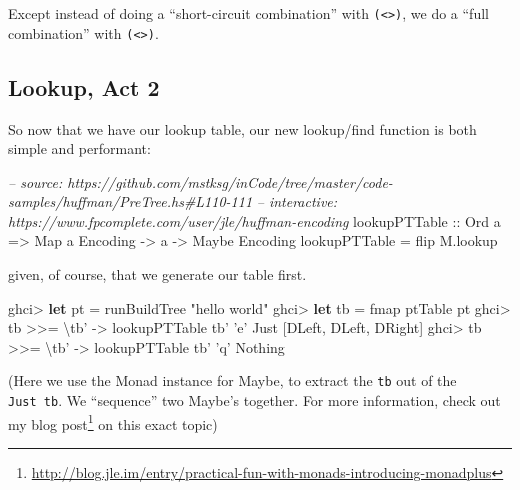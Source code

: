 \documentclass[]{article}
\newenvironment{Shaded}{\begin{snugshade}}{\end{snugshade}}
\newcommand{\CharTok}[1]{\textcolor[rgb]{0.31,0.60,0.02}{#1}}
\newcommand{\CommentTok}[1]{\textcolor[rgb]{0.56,0.35,0.01}{\textit{#1}}}
\newcommand{\DataTypeTok}[1]{\textcolor[rgb]{0.13,0.29,0.53}{#1}}
\newcommand{\FunctionTok}[1]{\textcolor[rgb]{0.00,0.00,0.00}{#1}}
\newcommand{\KeywordTok}[1]{\textcolor[rgb]{0.13,0.29,0.53}{\textbf{#1}}}
\newcommand{\NormalTok}[1]{#1}
\newcommand{\OtherTok}[1]{\textcolor[rgb]{0.56,0.35,0.01}{#1}}
\newcommand{\StringTok}[1]{\textcolor[rgb]{0.31,0.60,0.02}{#1}}
\renewcommand{\href}[2]{#2\footnote{\url{#1}}}
\begin{document}
Except instead of doing a ``short-circuit combination'' with
\texttt{(\textless{}\textbar{}\textgreater{})}, we do a ``full combination''
with \texttt{(\textless{}\textgreater{})}.

\hypertarget{lookup-act-2}{%
\subsection{Lookup, Act 2}\label{lookup-act-2}}

So now that we have our lookup table, our new lookup/find function is both
simple and performant:

\begin{Shaded}
\begin{Highlighting}[]
\CommentTok{-- source: https://github.com/mstksg/inCode/tree/master/code-samples/huffman/PreTree.hs#L110-111}
\CommentTok{-- interactive: https://www.fpcomplete.com/user/jle/huffman-encoding}
\OtherTok{lookupPTTable ::} \DataTypeTok{Ord}\NormalTok{ a }\OtherTok{=>} \DataTypeTok{Map}\NormalTok{ a }\DataTypeTok{Encoding} \OtherTok{->}\NormalTok{ a }\OtherTok{->} \DataTypeTok{Maybe} \DataTypeTok{Encoding}
\NormalTok{lookupPTTable }\FunctionTok{=}\NormalTok{ flip M.lookup}
\end{Highlighting}
\end{Shaded}

given, of course, that we generate our table first.

\begin{Shaded}
\begin{Highlighting}[]
\NormalTok{ghci}\FunctionTok{>} \KeywordTok{let}\NormalTok{ pt }\FunctionTok{=}\NormalTok{ runBuildTree }\StringTok{"hello world"}
\NormalTok{ghci}\FunctionTok{>} \KeywordTok{let}\NormalTok{ tb }\FunctionTok{=}\NormalTok{ fmap ptTable pt}
\NormalTok{ghci}\FunctionTok{>}\NormalTok{ tb }\FunctionTok{>>=}\NormalTok{ \textbackslash{}tb' }\OtherTok{->}\NormalTok{ lookupPTTable tb' }\CharTok{'e'}
\DataTypeTok{Just}\NormalTok{ [}\DataTypeTok{DLeft}\NormalTok{, }\DataTypeTok{DLeft}\NormalTok{, }\DataTypeTok{DRight}\NormalTok{]}
\NormalTok{ghci}\FunctionTok{>}\NormalTok{ tb }\FunctionTok{>>=}\NormalTok{ \textbackslash{}tb' }\OtherTok{->}\NormalTok{ lookupPTTable tb' }\CharTok{'q'}
\DataTypeTok{Nothing}
\end{Highlighting}
\end{Shaded}

(Here we use the Monad instance for Maybe, to extract the
\texttt{tb\textquotesingle{}} out of the \texttt{Just\ tb}. We ``sequence'' two
Maybe's together. For more information, check out my
\href{http://blog.jle.im/entry/practical-fun-with-monads-introducing-monadplus}{blog
post} on this exact topic)
\end{document}
